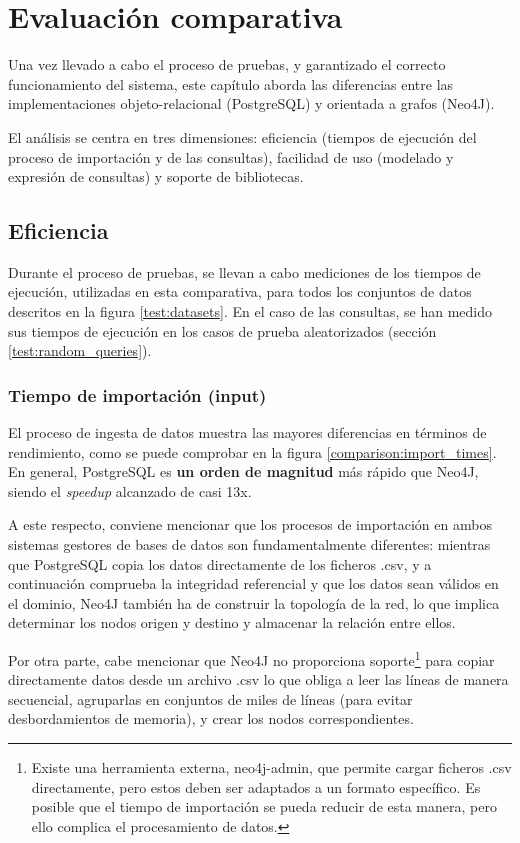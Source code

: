
\chapter{Evaluación comparativa} \label{chapter:comparison}

Una vez llevado a cabo el proceso de pruebas, y garantizado el correcto funcionamiento del sistema, este capítulo aborda las diferencias entre las implementaciones objeto-relacional (PostgreSQL) y orientada a grafos (Neo4J).

El análisis se centra en tres dimensiones: eficiencia (tiempos de ejecución del proceso de importación y de las consultas), facilidad de uso (modelado y expresión de consultas) y soporte de bibliotecas.

\section{Eficiencia}

Durante el proceso de pruebas, se llevan a cabo mediciones de los tiempos de ejecución, utilizadas en esta comparativa, para todos los conjuntos de datos descritos en la figura \ref{test:datasets}. En el caso de las consultas, se han medido sus tiempos de ejecución en los casos de prueba aleatorizados (sección \ref{test:random_queries}).



\subsection{Tiempo de importación (input)}

El proceso de ingesta de datos muestra las mayores diferencias en términos de rendimiento, como se puede comprobar en la figura \ref{comparison:import_times}. En general, PostgreSQL es \textbf{un orden de magnitud} más rápido que Neo4J, siendo el \textit{speedup} alcanzado de casi 13x.

A este respecto, conviene mencionar que los procesos de importación en ambos sistemas gestores de bases de datos son fundamentalmente diferentes: mientras que PostgreSQL copia los datos directamente de los ficheros .csv, y a continuación comprueba la integridad referencial y que los datos sean válidos en el dominio, Neo4J también ha de construir la topología de la red, lo que implica determinar los nodos origen y destino y almacenar la relación entre ellos.

Por otra parte, cabe mencionar que Neo4J no proporciona soporte\footnote{Existe una herramienta externa, neo4j-admin, que permite cargar ficheros .csv directamente, pero estos deben ser adaptados a un formato específico. Es posible que el tiempo de importación se pueda reducir de esta manera, pero ello complica el procesamiento de datos.} para copiar directamente datos desde un archivo .csv lo que obliga a leer las líneas de manera secuencial, agruparlas en conjuntos de miles de líneas (para evitar desbordamientos de memoria), y crear los nodos correspondientes.

